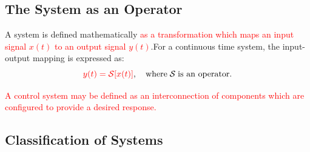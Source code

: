 \documentclass[
  12pt,
  a4paper,
]{report}
\newcommand{\redtext}[1]{\textcolor{red}{#1}}
\begin{document}
\subsection{The System as an Operator}\label{the-system-as-an-operator}

\begin{tcolorbox}[colback=boxbodycol,colframe=boxheadcol,title=\textcolor{red}{\textbf{The System Operator}}]    
A system is defined mathematically \textcolor{red}{as a transformation which maps an input signal \(x(t)\) to an output signal \(y(t)\)}.For a continuous time system, the input-output mapping is expressed as:
\begin{equation}
    \label{eq:system-operator-def-equation}
    \textcolor{red}{y(t) = \mathcal{S}[x(t)]}, \quad \text{where} \; \mathcal{S} \; \text{is an operator.}
\end{equation}
\begin{center}
\end{center}
\redtext{%
        A control system may be defined as an interconnection of components which are configured to provide a desired response.}
\end{tcolorbox}

\subsection{Classification of Systems}\label{classification-of-systems}

\newpage{}

\newpage{}
\end{document}
